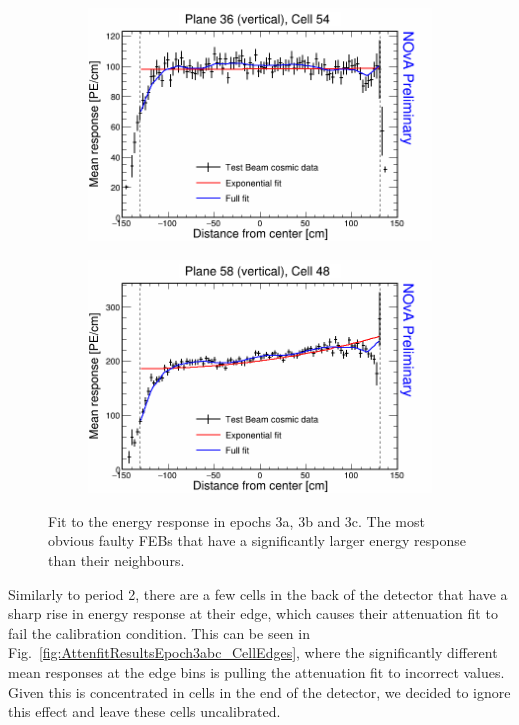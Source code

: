 \begin{figure}[h]
  \begin{subfigure}{0.495\textwidth}
    \includegraphics[width=\linewidth]{Plots/RelativeCalibrationResults/ep3abc_036_054.png}
  \end{subfigure}
  \begin{subfigure}{0.495\textwidth}
    \includegraphics[width=\linewidth]{Plots/RelativeCalibrationResults/ep3abc_058_048.png}
  \end{subfigure}
  \caption[Attenuation fits for cells with faulty readout in period 3 data]{Fit to the energy response in epochs 3a, 3b and 3c. The most obvious faulty FEBs that have a significantly larger energy response than their neighbours.}
  \label{fig:AttenfitResultsEpoch3abc_FaultyFEBs}
\end{figure}

Similarly to period 2, there are a few cells in the back of the detector that have a sharp rise in energy response at their edge, which causes their attenuation fit to fail the calibration condition. This can be seen in Fig.~\ref{fig:AttenfitResultsEpoch3abc_CellEdges}, where the significantly different mean responses at the edge bins is pulling the attenuation fit to incorrect values. Given this is concentrated in cells in the end of the detector, we decided to ignore this effect and leave these cells uncalibrated.

